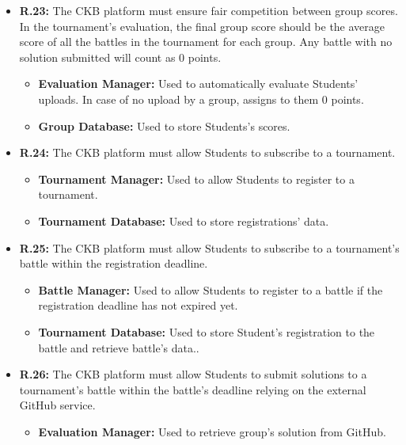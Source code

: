 \documentclass{article}
\begin{document}
{\begin{itemize}
\begin{itemize}
              give them a score and subsequently update Students' tournament score.
              \item \textbf{Group Database:} Used to store Students's scores.
          \end{itemize}
    \item \textbf{R.23:} The CKB platform must ensure fair competition between group scores. In the tournament's evaluation, the final
          group score should be the average score of all the battles in the tournament for each group. Any battle with no solution submitted will count
          as 0 points.
          \begin{itemize}
            \item \textbf{Evaluation Manager:} Used to automatically evaluate Students' uploads.
            In case of no upload by a group, assigns to them 0 points.
            \item \textbf{Group Database:} Used to store Students's scores.
          \end{itemize}
    \item \textbf{R.24:} The CKB platform must allow Students to subscribe to a tournament.
          \begin{itemize}
              \item \textbf{Tournament Manager:} Used to allow Students to register to a tournament.
              \item \textbf{Tournament Database:} Used to store registrations' data.
          \end{itemize}
    \item \textbf{R.25:} The CKB platform must allow Students to subscribe to a tournament's battle
          within the registration deadline.
          \begin{itemize}
              \item \textbf{Battle Manager:} Used to allow Students to register to a battle if the
              registration deadline has not expired yet.
              \item \textbf{Tournament Database:} Used to store Student's registration to the battle
              and retrieve battle's data..
          \end{itemize}
    \item \textbf{R.26:} The CKB platform must allow Students to submit solutions to a tournament's battle
        within the battle's deadline relying on the external GitHub service.
          \begin{itemize}
              \item \textbf{Evaluation Manager:} Used to retrieve group's solution from GitHub.

\end{itemize}
\end{itemize}}
\end{document}
